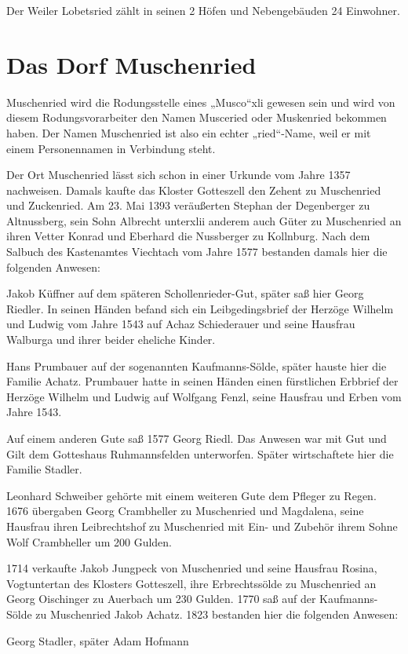 \documentclass[12pt,a4pager]{book}
\begin{document}
Der Weiler Lobetsried zählt in seinen 2 Höfen und Nebengebäuden 24 Einwohner.

\section{Das Dorf Muschenried}

Muschenried wird die Rodungsstelle eines „Musco“xli gewesen sein und wird von
diesem Rodungsvorarbeiter den Namen Musceried oder Muskenried bekommen haben.
Der Namen Muschenried ist also ein echter „ried“-Name, weil er mit einem
Personennamen in Verbindung steht.

Der Ort Muschenried lässt sich schon in einer Urkunde vom Jahre 1357 nachweisen.
Damals kaufte das Kloster Gotteszell den Zehent zu Muschenried und Zuckenried.
Am 23. Mai 1393 veräußerten Stephan der Degenberger zu Altnussberg, sein Sohn
Albrecht unterxlii anderem auch Güter zu Muschenried an ihren Vetter Konrad und
Eberhard die Nussberger zu Kollnburg. Nach dem Salbuch des Kastenamtes Viechtach
vom Jahre 1577 bestanden damals hier die folgenden Anwesen:

Jakob Küffner auf dem späteren Schollenrieder-Gut, später saß hier Georg
Riedler. In seinen Händen befand sich ein Leibgedingsbrief der Herzöge Wilhelm
und Ludwig vom Jahre 1543 auf Achaz Schiederauer und seine Hausfrau Walburga und
ihrer beider eheliche Kinder.

Hans Prumbauer auf der sogenannten Kaufmanns-Sölde, später hauste hier die
Familie Achatz. Prumbauer hatte in seinen Händen einen fürstlichen Erbbrief der
Herzöge Wilhelm und Ludwig auf Wolfgang Fenzl, seine Hausfrau und Erben vom
Jahre 1543.

Auf einem anderen Gute saß 1577 Georg Riedl. Das Anwesen war mit Gut und Gilt
dem Gotteshaus Ruhmannsfelden unterworfen. Später wirtschaftete hier die Familie
Stadler.

Leonhard Schweiber gehörte mit einem weiteren Gute dem Pfleger zu Regen. 1676
übergaben Georg Crambheller zu Muschenried und Magdalena, seine Hausfrau ihren
Leibrechtshof zu Muschenried mit Ein- und Zubehör ihrem Sohne Wolf Crambheller
um 200 Gulden.

1714 verkaufte Jakob Jungpeck von Muschenried und seine Hausfrau Rosina,
Vogtuntertan des Klosters Gotteszell, ihre Erbrechtssölde zu Muschenried an
Georg Oischinger zu Auerbach um 230 Gulden. 1770 saß auf der Kaufmanns-Sölde zu
Muschenried Jakob Achatz. 1823 bestanden hier die folgenden Anwesen:

Georg Stadler, später Adam Hofmann
\end{document}
